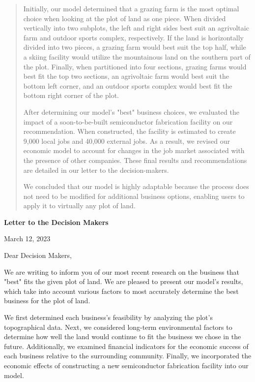 \documentclass{mcmthesis}
\begin{document}
\begin{abstract}
Initially, our model determined that a grazing farm is the most optimal choice when looking at the plot of land as one piece. When divided vertically into two subplots, the left and right sides best suit an agrivoltaic farm and outdoor sports complex, respectively. If the land is horizontally divided into two pieces, a grazing farm would best suit the top half, while a skiing facility would utilize the mountainous land on the southern part of the plot. Finally, when partitioned into four sections, grazing farms would best fit the top two sections, an agrivoltaic farm would best suit the bottom left corner, and an outdoor sports complex would best fit the bottom right corner of the plot.

After determining our model's "best" business choices, we evaluated the impact of a soon-to-be-built semiconductor fabrication facility on our recommendation. When constructed, the facility is estimated to create 9,000 local jobs and 40,000 external jobs. As a result, we revised our economic model to account for changes in the job market associated with the presence of other companies. These final results and recommendations are detailed in our letter to the decision-makers. 

We concluded that our model is highly adaptable because the process does not need to be modified for additional business options, enabling users to apply it to virtually any plot of land.
\end{abstract}

\maketitle

\centerline{\textbf{Letter to the Decision Makers}}

\noindent March 12, 2023

\noindent Dear Decision Makers, 

We are writing to inform you of our most recent research on the business that "best" fits the given plot of land. We are pleased to present our model's results, which take into account various factors to most accurately determine the best business for the plot of land. 

We first determined each business's feasibility by analyzing the plot's topographical data. Next, we considered long-term environmental factors to determine how well the land would continue to fit the business we chose in the future. Additionally, we examined financial indicators for the economic success of each business relative to the surrounding community. Finally, we incorporated the economic effects of constructing a new semiconductor fabrication facility into our model.
\end{document}

